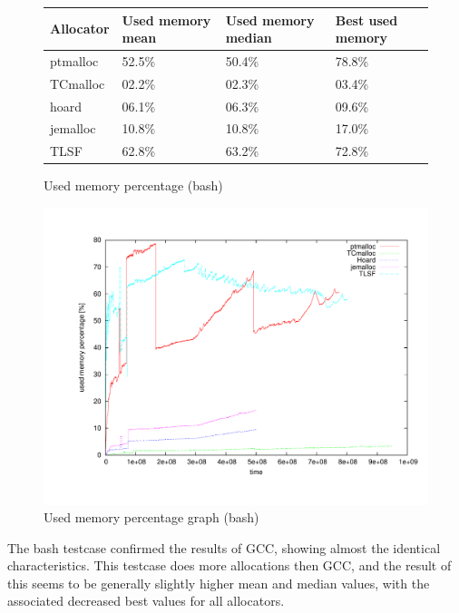 \begin{figure}[h]
\begin{center}
\begin{tabular}{|l|l|l|l|}
\hline
Allocator & Used memory mean & Used memory median & Best used memory \\ \hline \hline
ptmalloc  & 52.5\% & 50.4\% & 78.8\% \\ \hline
TCmalloc  & 02.2\% & 02.3\% & 03.4\% \\ \hline
hoard     & 06.1\% & 06.3\% & 09.6\% \\ \hline
jemalloc  & 10.8\% & 10.8\% & 17.0\% \\ \hline
TLSF      & 62.8\% & 63.2\% & 72.8\% \\ \hline
\end{tabular}
\caption{Used memory percentage (bash)}
\label{used:bash:table}
\end{center}
\end{figure}

\begin{figure}[h]
\begin{center}
\includegraphics[width=\linewidth,keepaspectratio]{fig/bash-used}
\caption{Used memory percentage graph (bash)}
\label{used:gcc:graph}
\end{center}
\end{figure}

The bash testcase confirmed the results of GCC, showing almost the identical characteristics. This testcase does more allocations then GCC, and the result of this seems to be generally slightly higher mean and median values, with the associated decreased best values for all allocators.

